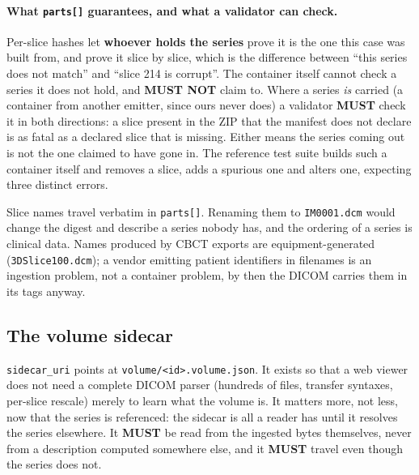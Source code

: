 \documentclass[11pt,a4paper]{article}
\newcommand{\MUST}{\textcolor{uosred}{\textbf{MUST}}}
\newcommand{\MUSTNOT}{\textcolor{uosred}{\textbf{MUST NOT}}}
\newcommand{\code}[1]{\texttt{\small #1}}
\begin{document}
\paragraph{What \code{parts[]} guarantees, and what a validator can check.}
Per-slice hashes let \textbf{whoever holds the series} prove it is the one this case was
built from, and prove it slice by slice, which is the difference between ``this series
does not match'' and ``slice 214 is corrupt''. The container itself cannot check a series
it does not hold, and \MUSTNOT{} claim to. Where a series \emph{is} carried (a container from another emitter, since ours never does) a validator \MUST{} check it in both directions: a slice present in the ZIP that
the manifest does not declare is as fatal as a declared slice that is missing. Either means
the series coming out is not the one claimed to have gone in. The reference test suite
builds such a container itself and removes a slice, adds a spurious one and alters one,
expecting three distinct errors.

\newpage
Slice names travel verbatim in \code{parts[]}. Renaming them to \code{IM0001.dcm} would
change the digest and describe a series nobody has, and the ordering of a series is clinical
data. Names produced by CBCT exports are equipment-generated (\code{3DSlice100.dcm}); a
vendor emitting patient identifiers in filenames is an ingestion problem, not a container
problem, by then the DICOM carries them in its tags anyway.

\subsection{The volume sidecar}

\code{sidecar\_uri} points at \code{volume/<id>.volume.json}. It exists so that a web
viewer does not need a complete DICOM parser (hundreds of files, transfer syntaxes,
per-slice rescale) merely to learn what the volume is. It matters more, not less, now
that the series is referenced: the sidecar is all a reader has until it resolves the series
elsewhere. It \MUST{} be read from the ingested bytes themselves, never from a description
computed somewhere else, and it \MUST{} travel even though the series does not.
\end{document}
